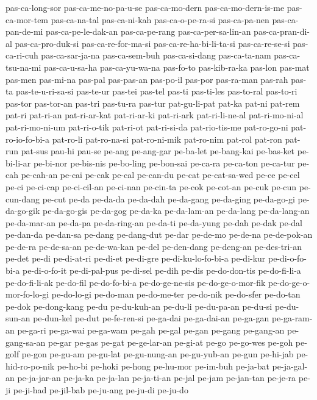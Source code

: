 {pas-ca-long-sor pas-ca-me-no-pa-u-se pas-ca-mo-dern pas-ca-mo-dern-is-me
pas-ca-mor-tem pas-ca-na-tal pas-ca-ni-kah pas-ca-o-pe-ra-si pas-ca-pa-nen
pas-ca-pan-de-mi pas-ca-pe-le-dak-an pas-ca-pe-rang pas-ca-per-sa-lin-an
pas-ca-pran-di-al pas-ca-pro-duk-si pas-ca-re-for-ma-si
pas-ca-re-ha-bi-li-ta-si pas-ca-re-se-si pas-ca-ri-cuh pas-ca-sar-ja-na
pas-ca-sem-buh pas-ca-si-dang pas-ca-ta-nam pas-ca-tsu-na-mi
pas-ca-u-sa-ha pas-ca-yu-wa-na pas-fo-to pas-kib-ra-ka pas-lon pas-mat
pas-men pas-mi-na pas-pal pas-pas-an pas-po-il pas-por pas-ra-man pas-rah
pas-ta pas-te-u-ri-sa-si pas-te-ur pas-tei pas-tel pas-ti pas-ti-les
pas-to-ral pas-to-ri pas-tor pas-tor-an pas-tri pas-tu-ra pas-tur
pat-gu-li-pat pat-ka pat-ni pat-rem pat-ri pat-ri-an pat-ri-ar-kat
pat-ri-ar-ki pat-ri-ark pat-ri-li-ne-al pat-ri-mo-ni-al pat-ri-mo-ni-um
pat-ri-o-tik pat-ri-ot pat-ri-si-da pat-rio-tis-me pat-ro-go-ni
pat-ro-io-fo-bi-a pat-ro-li pat-ro-na-si pat-ro-ni-mik pat-ro-nim pat-rol
pat-ron pat-run pat-sus pau-hi pau-se pe-ang pe-ang-gar pe-ba-let
pe-bang-kai pe-bas-ket pe-bi-li-ar pe-bi-nor pe-bis-nis pe-bo-ling
pe-bon-sai pe-ca-ra pe-ca-ton pe-ca-tur pe-cah pe-cah-an pe-cai pe-cak
pe-cal pe-can-du pe-cat pe-cat-sa-wed pe-ce pe-cel pe-ci pe-ci-cap
pe-ci-cil-an pe-ci-nan pe-cin-ta pe-cok pe-cot-an pe-cuk pe-cun
pe-cun-dang pe-cut pe-da pe-da-da pe-da-dah pe-da-gang pe-da-ging
pe-da-go-gi pe-da-go-gik pe-da-go-gis pe-da-gog pe-da-ka pe-da-lam-an
pe-da-lang pe-da-lang-an pe-da-mar-an pe-da-pa pe-da-ring-an pe-da-ti
pe-da-yung pe-dah pe-dak pe-dal pe-dan-da pe-dan-sa pe-dang pe-dang-dut
pe-dar pe-de-mo pe-de-na pe-de-pok-an pe-de-ra pe-de-sa-an pe-de-wa-kan
pe-del pe-den-dang pe-deng-an pe-des-tri-an pe-det pe-di pe-di-at-ri
pe-di-et pe-di-gre pe-di-ku-lo-fo-bi-a pe-di-kur pe-di-o-fo-bi-a
pe-di-o-fo-it pe-di-pal-pus pe-di-sel pe-dih pe-dis pe-do-don-tis
pe-do-fi-li-a pe-do-fi-li-ak pe-do-fil pe-do-fo-bi-a pe-do-ge-ne-sis
pe-do-ge-o-mor-fik pe-do-ge-o-mor-fo-lo-gi pe-do-lo-gi pe-do-man
pe-do-me-ter pe-do-nik pe-do-sfer pe-do-tan pe-dok pe-dong-kang pe-du
pe-du-kuh-an pe-du-li pe-du-pa-an pe-du-si pe-du-sun-an pe-dun-kel pe-dut
pe-fe-ren-si pe-ga-dai pe-ga-dai-an pe-ga-gan pe-ga-ram-an pe-ga-ri
pe-ga-wai pe-ga-wam pe-gah pe-gal pe-gan pe-gang pe-gang-an pe-gang-sa-an
pe-gar pe-gas pe-gat pe-ge-lar-an pe-gi-at pe-go pe-go-wes pe-goh pe-golf
pe-gon pe-gu-am pe-gu-lat pe-gu-nung-an pe-gu-yub-an pe-gun pe-hi-jab
pe-hid-ro-po-nik pe-ho-bi pe-hoki pe-hong pe-hu-mor pe-im-buh pe-ja-bat
pe-ja-gal-an pe-ja-jar-an pe-ja-ka pe-ja-lan pe-ja-ti-an pe-jal pe-jam
pe-jan-tan pe-je-ra pe-ji pe-ji-had pe-jil-bab pe-ju-ang pe-ju-di pe-ju-do
}
